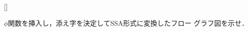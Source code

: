 \documentclass[dvipdfmx]{jarticle}
\newcounter{coffee}
\begin{document}
\begin{list}{[]}{}
\begin{list}
                    $\phi$関数を挿入し，添え字を決定してSSA形式に変換したフロー
                    グラフ図を示せ．
          \end{list}
\end{list}
\end{document}
